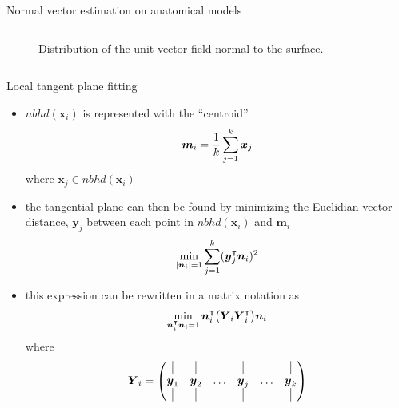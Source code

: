 \documentclass[xcolor=dvipsnames,10pt]{beamer}
\begin{document}
\begin{frame}{Normal vector estimation on anatomical models}
\begin{columns}[c]
\begin{column}{0.5\textwidth}
\begin{onlyenv}
\begin{center}
\begin{figure}
                    \caption{Distribution of the unit vector field normal to the surface.}
                \end{figure}
                \end{center}
            \end{onlyenv}
        \end{column}
    \end{columns} 
\end{frame}

\begin{frame}{Local tangent plane fitting}
    \begin{itemize}
        \item $nbhd(\boldsymbol{x}_i)$ is represented with the ``centroid''
        \begin{equation*}
            \centering
            \boldsymbol{m}_i = \frac{1}{k} \sum_{j=1}^k \boldsymbol{x}_j
        \end{equation*}
        where $\boldsymbol{x}_j \in nbhd(\boldsymbol{x}_i)$
        \item the tangential plane can then be found by minimizing the Euclidian vector distance, $\boldsymbol{y}_j$ between each point in $nbhd(\boldsymbol{x}_i)$ and $\boldsymbol{m}_i$
        \begin{equation*}
            \centering
            \min_{|\boldsymbol{n}_i|=1} \sum_{j=1}^{k} (\boldsymbol{y}_j^\intercal \boldsymbol{n}_i)^2
        \end{equation*}
        \item this expression can be rewritten in a matrix notation as
        \begin{equation*}
            \centering
            \min_{\boldsymbol{n}_i^\intercal \boldsymbol{n}_i = 1} \boldsymbol{n}_i^\intercal \big( \boldsymbol{Y}_i \boldsymbol{Y}_i^\intercal \big) \boldsymbol{n}_i
        \end{equation*}
        where
        \begin{equation*}
            \centering
            \boldsymbol{Y}_i = \begin{pmatrix}
            \vline & \vline &  & \vline &  & \vline \\
            \boldsymbol{y}_1 & \boldsymbol{y}_2 & \dots & \boldsymbol{y}_j & \dots & \boldsymbol{y}_k \\
            \vline & \vline &  & \vline &  & \vline
            \end{pmatrix}
        \end{equation*}
    \end{itemize}
\end{frame}
\end{document}

